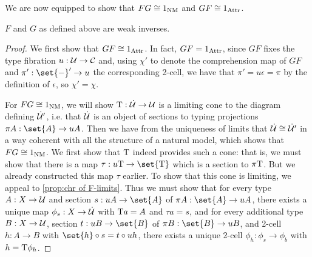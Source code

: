 \documentclass[../thesis.tex]{subfiles}
\begin{document}
We are now equipped to show that $FG \cong 1_{\mathrm{NM}}$ and $GF \cong 1_{\mathrm{Attr}}$.
\begin{theorem}
  $F$ and $G$ as defined above are weak inverses.
\end{theorem}
\begin{proof}
  We first show that $GF \cong 1_{\mathrm{Attr}}$. In fact, $GF = 1_{\mathrm{Attr}}$, since $GF$ fixes the type fibration $u : {\mathcal{U}} \to {\mathcal{C}}$ and,
  using $\chi'$ to denote the comprehension map of $GF$ and $\pi' : \set{-}' \to u$ the corresponding 2-cell, we have that
  $\pi' = u\epsilon = \pi$ by the definition of $\epsilon$, so $\chi' = \chi$. 
  
  For $FG \cong 1_{\mathrm{NM}}$, we will show ${{\mathrm{T}}} : \dot{{\mathcal{U}}} \to {\mathcal{U}}$ is a limiting cone to the diagram defining $\dot{{\mathcal{U}}}'$, i.e. that
  $\dot{{\mathcal{U}}}$ is an object of sections to typing projections $\pi A : \set{A} \to uA$. Then we have from the uniqueness of limits
  that $\dot{{\mathcal{U}}} \cong \dot{{\mathcal{U}}}'$ in a way coherent with all the structure of a natural model, which shows that $FG \cong 1_{\mathrm{NM}}$.
  We first show that ${{\mathrm{T}}}$ indeed provides such a cone: that is, we must show that there is a map $\tau : u\typ \to \set{\typ}$
  which is a section to $\pi{{\mathrm{T}}}$. But we already constructed this map $\tau$ earlier. To show that this cone is limiting,
  we appeal to \cref{prop:chr of F-limits}. Thus we must show that for every type $A : X \to {\mathcal{U}}$ and section $s : uA \to
  \set{A}$ of $\pi A : \set{A} \to uA$, there exists a unique map $\phi_s : X \to \dot{{\mathcal{U}}}$ with ${{\mathrm{T}}} a = A$ and $\tau a = s$,
  and for every additional type $B : X \to {\mathcal{U}}$, section $t : uB \to \set{B}$ of $\pi B: \set{B} \to uB$, and 2-cell $h : A \to
  B$ with $\set{h} \circ s = t \circ uh$, there exists a unique 2-cell $\phi_h : \phi_s \to \phi_b$ with $h = {{\mathrm{T}}} \phi_h$.


\end{proof}
\end{document}
